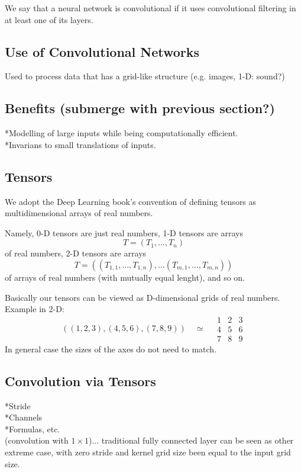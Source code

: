 \documentclass[]{article}
\begin{document}
We say that a neural network is convolutional if it uses convolutional filtering
in at least one of its layers.

\subsection{Use of Convolutional Networks}
Used to process data that has a grid-like structure (e.g. images, 1-D: sound?)

\subsection{Benefits (submerge with previous section?)}
*Modelling of large inputs while being computationally efficient.\\
*Invarians to small translations of inputs.

\subsection{Tensors}
We adopt the Deep Learning book's convention of defining tensors as
multidimensional arrays of real numbers.

Namely, 0-D tensors are just real numbers, 1-D tensors are arrays
\[
T = (T_1, \ldots, T_n)
\]
of real numbers, 2-D tensors are arrays
\[
T = ((T_{1,1}, \ldots, T_{1,n}), \ldots (T_{m,1}, \ldots, T_{m,n}))
\]
of arrays of real numbers (with mutually equal lenght), and so on.

Basically our tensors can be viewed as D-dimensional grids of real numbers.
Example in 2-D:
\[
((1, 2, 3), (4, 5, 6), (7, 8, 9)) \quad \simeq \quad
\begin{array}{c|c|c}
  1 & 2 & 3 \\
  \hline
  4 & 5 & 6 \\
  \hline
  7 & 8 & 9
 \end{array}
\]
In general case the sizes of the axes do not need to match.


\subsection{Convolution via Tensors}
*Stride\\
*Channels\\
*Formulas, etc.\\
(convolution with $1\times 1$)... traditional fully connected layer can be seen
as other extreme case, with zero stride and kernel grid size been equal to the
input grid size.
\end{document}
